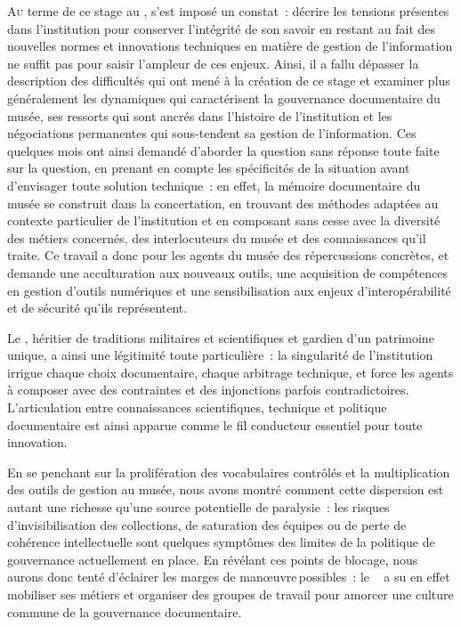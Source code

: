 \lettrine{A}{u} terme de ce stage au \maelong, s'est imposé un constat~: décrire les tensions présentes dans l'institution pour conserver l'intégrité de son savoir en restant au fait des nouvelles normes et innovations techniques en matière de gestion de l'information ne suffit pas pour saisir l'ampleur de ces enjeux. Ainsi, il a fallu dépasser la description des difficultés qui ont mené à la création de ce stage et examiner plus généralement les dynamiques qui caractérisent la gouvernance documentaire du musée, ses ressorts qui sont ancrés dans l'histoire de l'institution et les négociations permanentes qui sous-tendent sa gestion de l’information. Ces quelques mois ont ainsi demandé d'aborder la question sans réponse toute faite sur la question, en prenant en compte les spécificités de la situation avant d'envisager toute solution technique~: en effet, la mémoire documentaire du musée se construit dans la concertation, en trouvant des méthodes adaptées au contexte particulier de l'institution et en composant sans cesse avec la diversité des métiers concernés, des interlocuteurs du musée et des connaissances qu'il traite. Ce travail a donc pour les agents du musée des répercussions concrètes, et demande une acculturation aux nouveaux outils, une acquisition de compétences en gestion d’outils numériques et une sensibilisation aux enjeux d'interopérabilité et de sécurité qu'ils représentent.

\medskip

Le \mae, héritier de traditions militaires et scientifiques et gardien d’un patrimoine unique, a ainsi une légitimité toute particulière~: la singularité de l’institution irrigue chaque choix documentaire, chaque arbitrage technique, et force les agents à composer avec des contraintes et des injonctions parfois contradictoires. L’articulation entre connaissances scientifiques, technique et politique documentaire est ainsi apparue comme le fil conducteur essentiel pour toute innovation.



En se penchant sur la prolifération des vocabulaires contrôlés et la multiplication des outils de gestion au musée, nous avons montré comment cette dispersion est autant une richesse qu'une source potentielle de paralysie~: les risques d’invisibilisation des collections, de saturation des équipes ou de perte de cohérence intellectuelle sont quelques symptômes des limites de la politique de gouvernance actuellement en place. En révélant ces points de blocage, nous aurons donc tenté d'éclairer les marges de manœuvre possibles~: le \mae~ a su en effet mobiliser ses métiers et organiser des groupes de travail pour amorcer une culture commune de la gouvernance documentaire.





